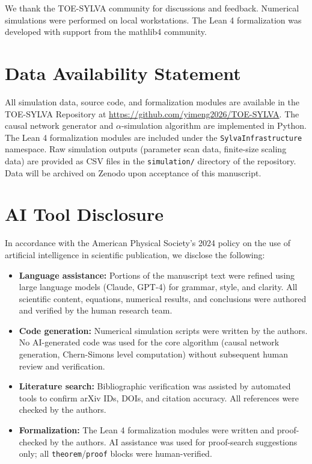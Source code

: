 \documentclass[11pt,a4paper]{article}
\theoremstyle{definition}
\theoremstyle{remark}
\begin{document}
We thank the TOE-SYLVA community for discussions and feedback. Numerical
simulations were performed on local workstations. The Lean 4 formalization was
developed with support from the mathlib4 community.

\section*{Data Availability Statement}
\label{sec:data}

All simulation data, source code, and formalization modules are available in the
TOE-SYLVA Repository at \url{https://github.com/yimeng2026/TOE-SYLVA}. The
causal network generator and $\alpha$-simulation algorithm are implemented in
Python. The Lean 4 formalization modules are included under the
\texttt{SylvaInfrastructure} namespace. Raw simulation outputs (parameter scan
data, finite-size scaling data) are provided as CSV files in the
\texttt{simulation/} directory of the repository. Data will be archived on
Zenodo upon acceptance of this manuscript.

\section*{AI Tool Disclosure}
\label{sec:ai}

In accordance with the American Physical Society's 2024 policy on the use of
artificial intelligence in scientific publication, we disclose the following:

\begin{itemize}[noitemsep]
\item \textbf{Language assistance:} Portions of the manuscript text were refined
using large language models (Claude, GPT-4) for grammar, style, and clarity.
All scientific content, equations, numerical results, and conclusions were
authored and verified by the human research team.
\item \textbf{Code generation:} Numerical simulation scripts were written by the
authors. No AI-generated code was used for the core algorithm (causal network
generation, Chern-Simons level computation) without subsequent human review and
verification.
\item \textbf{Literature search:} Bibliographic verification was assisted by
automated tools to confirm arXiv IDs, DOIs, and citation accuracy. All
references were checked by the authors.
\item \textbf{Formalization:} The Lean 4 formalization modules were written and
proof-checked by the authors. AI assistance was used for proof-search
suggestions only; all \texttt{theorem}/\texttt{proof} blocks were human-verified.
\end{itemize}
\end{document}
